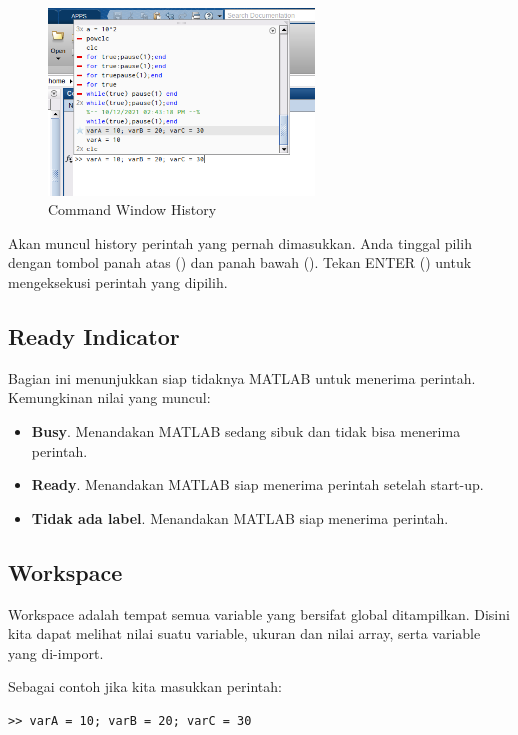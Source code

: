 \documentclass[12pt]{book}
\begin{document}
\begin{itemize}
		\begin{figure}[!ht]
			\centering
			\includegraphics[width=200pt]{images/commandhistory}
			\caption{Command Window History}
		\end{figure}
		
		Akan muncul history perintah yang pernah dimasukkan.
		Anda tinggal pilih dengan tombol panah atas (\keys{$\uparrow$}) dan panah bawah (\keys{$\downarrow$}).
		Tekan ENTER (\keys{\return}) untuk mengeksekusi perintah yang dipilih.
		
	\end{itemize}
	
	\subsection{Ready Indicator}
	
	Bagian ini menunjukkan siap tidaknya MATLAB untuk menerima perintah.
	Kemungkinan nilai yang muncul:
	\begin{itemize}
		\item \textbf{Busy}. Menandakan MATLAB sedang sibuk dan tidak bisa menerima perintah.
		\item \textbf{Ready}. Menandakan MATLAB siap menerima perintah setelah start-up.
		\item \textbf{Tidak ada label}. Menandakan MATLAB siap menerima perintah.
	\end{itemize}
	
	\subsection{Workspace}
	
	Workspace adalah tempat semua variable yang bersifat global ditampilkan.
	Disini kita dapat melihat nilai suatu variable, ukuran dan nilai array, serta variable yang di-import.
	
	Sebagai contoh jika kita masukkan perintah:
	\begin{verbatim}
>> varA = 10; varB = 20; varC = 30
	\end{verbatim}
\end{document}
